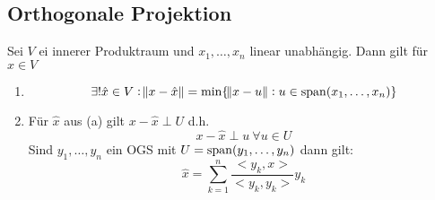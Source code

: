 \subsection{Orthogonale Projektion}
Sei $V$ ei innerer Produktraum und $x_1, \ldots, x_n$ linear unabhängig. Dann gilt
für $x \in V$
\begin{enumerate}[label= (\alph*)]
	\item
		\begin{equation*}
			\exists! \hat{x} \in V: \norm{x - \hat{x}} = 
			\min \{\norm{x-u}: u \in \operatorname{span}(x_1, \ldots, x_n) \}
		\end{equation*}
	\item
		Für $\hat{x}$ aus (a) gilt $x-\hat{x} \perp U$ d.h.
		\begin{equation*}
			x - \hat{x} \perp u\ \forall u \in U
		\end{equation*}
		Sind $y_1, \ldots, y_n$ ein OGS mit $U = \operatorname{span}(y_1, \ldots, y_n)$ dann gilt:
		\begin{equation*}
			\hat{x} = \sum_{k=1}^{n} \frac{<y_k,x>}{<y_k, y_k>} y_k
		\end{equation*}
\end{enumerate}